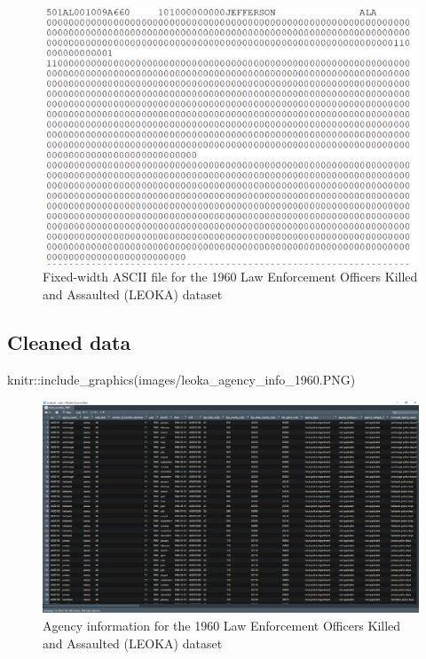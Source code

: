 \documentclass[
  12pt,
  openany]{book}
\newenvironment{Shaded}{\begin{snugshade}}{\end{snugshade}}
\newcommand{\FunctionTok}[1]{\textcolor[rgb]{0,0,0}{#1}}
\newcommand{\NormalTok}[1]{#1}
\newcommand{\SpecialCharTok}[1]{\textcolor[rgb]{0,0,0}{#1}}
\newcommand{\StringTok}[1]{\textcolor[rgb]{0.5,0.5,0.5}{#1}}
\begin{document}
\begin{figure}
\includegraphics[width=8.21in]{images/leoka_raw_ascii_1960} \caption{Fixed-width ASCII file for the 1960 Law Enforcement Officers Killed and Assaulted (LEOKA) dataset}\label{fig:unnamed-chunk-1}
\end{figure}

\hypertarget{cleaned-data-2}{%
\subsection{Cleaned data}\label{cleaned-data-2}}

\begin{Shaded}
\begin{Highlighting}[]
\NormalTok{knitr}\SpecialCharTok{::}\FunctionTok{include\_graphics}\NormalTok{(}\StringTok{\textquotesingle{}images/leoka\_agency\_info\_1960.PNG\textquotesingle{}}\NormalTok{)}
\end{Highlighting}
\end{Shaded}

\begin{figure}
\includegraphics[width=26.58in]{images/leoka_agency_info_1960} \caption{Agency information for the 1960 Law Enforcement Officers Killed and Assaulted (LEOKA) dataset}\label{fig:unnamed-chunk-2}
\end{figure}
\end{document}

